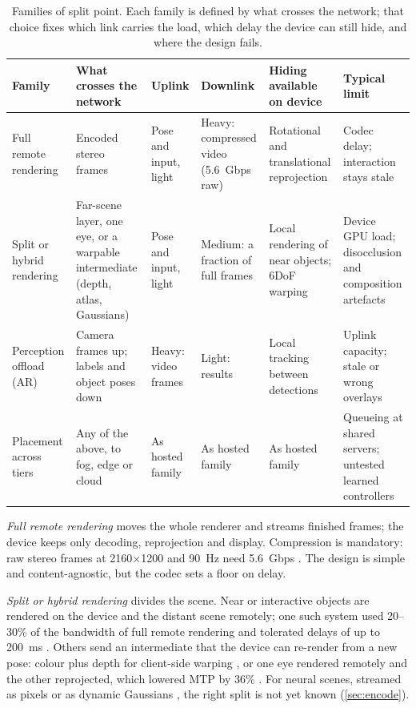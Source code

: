 \begin{table}[t]
\centering\small
\caption{Families of split point. Each family is defined by what crosses the network; that choice fixes
which link carries the load, which delay the device can still hide, and where the design fails.}
\label{tab:compute-splits}
\setlength{\tabcolsep}{3.5pt}
\renewcommand{\arraystretch}{1.08}
\begin{tabularx}{\linewidth}{@{}>{\raggedright\arraybackslash}p{2.05cm}
  >{\raggedright\arraybackslash}X>{\raggedright\arraybackslash}p{2.05cm}
  >{\raggedright\arraybackslash}p{2.55cm}>{\raggedright\arraybackslash}X
  >{\raggedright\arraybackslash}X@{}}
\toprule
Family & What crosses the network & Uplink & Downlink & Hiding available on device & Typical limit\\
\midrule
Full remote rendering & Encoded stereo frames & Pose and input, light & Heavy: compressed video (5.6~Gbps raw) & Rotational and translational reprojection & Codec delay; interaction stays stale\\
Split or hybrid rendering & Far-scene layer, one eye, or a warpable intermediate (depth, atlas, Gaussians) & Pose and input, light & Medium: a fraction of full frames & Local rendering of near objects; 6DoF warping & Device GPU load; disocclusion and composition artefacts\\
Perception offload (AR) & Camera frames up; labels and object poses down & Heavy: video frames & Light: results & Local tracking between detections & Uplink capacity; stale or wrong overlays\\
Placement across tiers & Any of the above, to fog, edge or cloud & As hosted family & As hosted family & As hosted family & Queueing at shared servers; untested learned controllers\\
\bottomrule
\end{tabularx}
\end{table}


\emph{Full remote rendering} moves the whole renderer and streams finished frames; the device keeps only
decoding, reprojection and display. Compression is mandatory: raw stereo frames at 2160$\times$1200 and
90~Hz need 5.6~Gbps \cite{W2838572662}. The design is simple and content-agnostic, but the codec sets a
floor on delay.

\emph{Split or hybrid rendering} divides the scene. Near or interactive objects are rendered on the device
and the distant scene remotely; one such system used 20--30\% of the bandwidth of full remote rendering
and tolerated delays of up to 200~ms \cite{W4389296467}. Others send an intermediate that the device can
re-render from a new pose: colour plus depth for client-side warping \cite{W2751899584}, or one
eye rendered remotely and the other reprojected, which lowered MTP by 36\% \cite{W4391557896}. For neural scenes, streamed as pixels or as dynamic
Gaussians \cite{W7106240991}, the right split is not yet known (\cref{sec:encode}).

